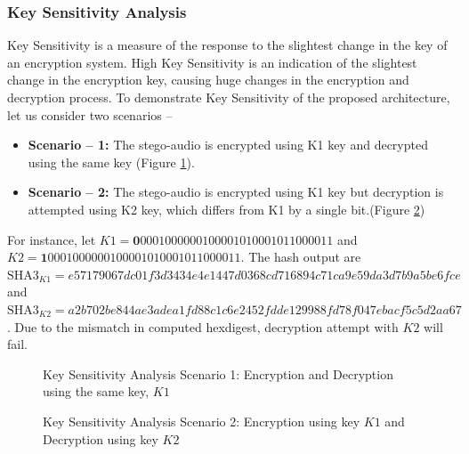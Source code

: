 \documentclass[a4paper]{cas-sc}
\begin{document}
\subsubsection{Key Sensitivity Analysis}
Key Sensitivity is a measure of the response to the slightest change in the key of an encryption system. High Key Sensitivity is an indication of the slightest change in the encryption key, causing huge changes in the encryption and decryption process. To demonstrate Key Sensitivity of the proposed architecture, let us consider two scenarios --
\begin{itemize}
    \item \textbf{Scenario -- 1:} The stego-audio is encrypted using K1 key and decrypted using the same key (Figure \ref{fig:keySensitivityK1}).
    \item \textbf{Scenario -- 2:} The stego-audio is encrypted using K1 key but decryption is attempted using K2 key, which differs from K1 by a single bit.(Figure \ref{fig:keySensitivityK2})
\end{itemize}
For instance, let $K1=\mathbf{0}0001000000100001010001011000011$ and $K2=\mathbf{1}0001000000100001010001011000011$. The hash output are $\text{SHA3}_{K1}=e57179067dc01f3d3434e4e1447d0368cd716894c71ca9e59da3d7b9a5be6fce$ and $\text{SHA3}_{K2}=a2b702be844ae3adea1fd88c1c6e2452fdde129988fd78f047ebacf5c5d2aa67$. Due to the mismatch in computed hexdigest, decryption attempt with $K2$ will fail.
\begin{figure}[pos=h]
    \begin{center}
        
        \caption{Key Sensitivity Analysis Scenario 1: Encryption and Decryption using the same key, $K1$}
        \label{fig:keySensitivityK1}
    \end{center}
\end{figure}
\begin{figure}[pos=h]
    \begin{center}
        
        \caption{Key Sensitivity Analysis Scenario 2: Encryption using key $K1$ and Decryption using key $K2$}
        \label{fig:keySensitivityK2}
    \end{center}
\end{figure}
\end{document}
